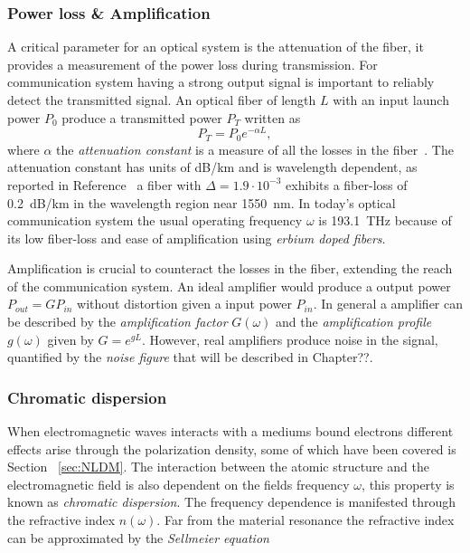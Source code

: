 \subsubsection{Power loss \& Amplification}
A critical parameter for an optical system is the attenuation of the fiber, it provides a measurement of the power loss during transmission. For communication system having a strong output signal is important to reliably detect the transmitted signal. An optical fiber of length $L$ with an input launch power $P_0$ produce a transmitted power $P_T$ written as 
\begin{equation}
P_T=P_0e^{-\alpha L},
\end{equation}
where $\alpha$ the \emph{attenuation constant} is a measure of all the losses in the fiber~\cite{agrawal2000nonlinear}. The attenuation constant has units of dB/km and is wavelength dependent, as reported in Reference~\cite{miya1979ultimate} a fiber with $\Delta=1.9\cdot10^{-3}$ exhibits a fiber-loss of 0.2~dB/km in the wavelength region near 1550~nm. In today's optical communication system the usual operating frequency $\omega$ is 193.1~THz because of its low fiber-loss and ease of amplification using \textit{erbium doped fibers}.

Amplification is crucial to counteract the losses in the fiber, extending the reach of the communication system. An ideal amplifier would produce a output power $P_{out} = G P_{in}$ without distortion given a input power $P_{in}$. In general a amplifier can be described by the  \textit{amplification factor} $G(\omega)$ and the \textit{amplification profile} $g(\omega)$ given by $G=e^{gL}$. However, real amplifiers produce noise in the signal, quantified by the \textit{noise figure} that will be described in Chapter??.   



\subsubsection{Chromatic dispersion}\label{sec:CD}

When electromagnetic waves interacts with a mediums bound electrons different effects arise through the polarization density, some of which have been covered is Section~ \ref{sec:NLDM}. The interaction between the atomic structure and the electromagnetic field is also dependent on the fields frequency $\omega$, this property is known as \textit{chromatic dispersion}. The frequency dependence is manifested through the refractive index $n(\omega)$. Far from the material resonance the refractive index can be approximated by the \emph{Sellmeier equation}~\cite{agrawal2000nonlinear,FiberAgrawal}

